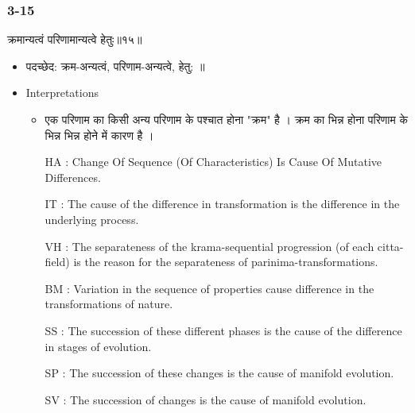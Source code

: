 \begin{frame}[fragile]\frametitle{3-15}
\begin{sanskrit}
क्रमान्यत्वं परिणामान्यत्वे हेतुः॥१५॥
\end{sanskrit}

	\begin{itemize}
	\item पदच्छेद: क्रम-अन्यत्वं, परिणाम-अन्यत्वे, हेतु: ॥
	\item Interpretations
		\begin{itemize}	
		\item एक परिणाम का किसी अन्य परिणाम के पश्चात होना "क्रम" है । क्रम का भिन्न होना परिणाम के भिन्न भिन्न होने में कारण है ।
		\item [HA]: Change Of Sequence (Of Characteristics) Is Cause Of Mutative Differences.
		\item [IT]: The cause of the difference in transformation is the difference in the underlying process.
		\item [VH]: The separateness of the krama-sequential progression (of each citta-field) is the reason for the separateness of parinima-transformations.
		\item [BM]: Variation in the sequence of properties cause difference in the transformations of nature.
		\item [SS]: The succession of these different phases is the cause of the difference in stages of evolution.
		\item [SP]: The succession of these changes is the cause of manifold evolution.
		\item [SV]: The succession of changes is the cause of manifold evolution. 
		\end{itemize}
	\end{itemize}
\end{frame}


